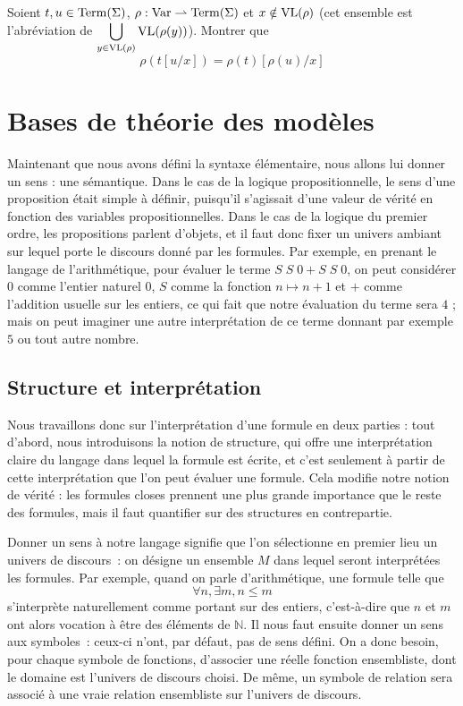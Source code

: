 \begin{exercise}
  Soient $t,u\in\operatorname{Term}(\Sigma)$, $\rho : \operatorname{Var} \rightharpoonup \operatorname{Term}(\Sigma)$ et
  $x \notin \operatorname{VL}(\rho)$ (cet ensemble est l'abréviation de
  $\displaystyle\bigcup_{y \in \operatorname{VL}(\rho)} \operatorname{VL}(\rho(y))$). Montrer que
  \[\rho(t[u/x]) = \rho(t)[\rho(u)/x]\]
\end{exercise}

\section{Bases de théorie des modèles}

Maintenant que nous avons défini la syntaxe élémentaire, nous allons lui donner
un sens : une sémantique. Dans le cas de la logique propositionnelle, le sens
d'une proposition était simple à définir, puisqu'il s'agissait d'une valeur de
vérité en fonction des variables propositionnelles. Dans le cas de la logique du
premier ordre, les propositions parlent d'objets, et il faut donc fixer un
univers ambiant sur lequel porte le discours donné par les formules. Par
exemple, en prenant le langage de l'arithmétique, pour évaluer le terme
$S\;S\;0 + S\;S\;0$, on peut considérer $0$ comme l'entier naturel $0$, $S$
comme la fonction $n \mapsto n + 1$ et $+$ comme l'addition usuelle sur les
entiers, ce qui fait que notre évaluation du terme sera $4$ ;
mais on peut imaginer une autre interprétation de ce terme donnant par exemple
$5$ ou tout autre nombre.

\subsection{Structure et interprétation}

Nous travaillons donc sur l'interprétation d'une formule en deux parties : tout
d'abord, nous introduisons la notion de structure, qui offre une interprétation
claire du langage dans lequel la formule est écrite, et c'est seulement à partir
de cette interprétation que l'on peut évaluer une formule. Cela modifie notre
notion de vérité : les formules closes prennent une plus grande importance que
le reste des formules, mais il faut quantifier sur des structures en
contrepartie.

Donner un sens à notre langage signifie que l'on sélectionne en premier lieu un
univers de discours~: on désigne un ensemble $M$ dans lequel seront interprétées
les formules. Par exemple, quand on parle d'arithmétique, une formule telle que
\[\forall n,\exists m, n \leq m\]
s'interprète naturellement comme portant sur des entiers, c'est-à-dire que $n$
et $m$ ont alors vocation à être des éléments de $\mathbb N$. Il nous faut
ensuite donner un sens aux symboles~: ceux-ci n'ont, par défaut, pas de sens
défini. On a donc besoin, pour chaque symbole de fonctions, d'associer une
réelle fonction ensembliste, dont le domaine est l'univers de discours choisi.
De même, un symbole de relation sera associé à une vraie relation ensembliste
sur l'univers de discours.

